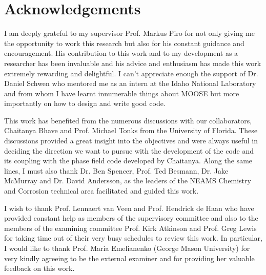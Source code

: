 \chapter*{Acknowledgements}
\label{acknowledgements}

I am deeply grateful to my supervisor Prof. Markus Piro for not only giving me the opportunity to work this research but also for his constant guidance and encouragement. His contribution to this work and to my development as a researcher has been invaluable and his advice and enthusiasm has made this work extremely rewarding and delightful. I can't appreciate enough the support of Dr. Daniel Schwen who mentored me as an intern at the Idaho National Laboratory and from whom I have learnt innumerable things about MOOSE but more importantly on how to design and write good code.

This work has benefited from the numerous discussions with our collaborators, Chaitanya Bhave and Prof. Michael Tonks from the University of Florida. These discussions provided a great insight into the objectives and were always useful in deciding the direction we want to pursue with the development of the code and its coupling with the phase field code developed by Chaitanya. Along the same lines, I must also thank Dr. Ben Spencer, Prof. Ted Besmann, Dr. Jake McMurray and Dr. David Andersson, as the leaders of the NEAMS Chemistry and Corrosion technical area facilitated and guided this work. %

I wish to thank Prof. Lennaert van Veen and Prof. Hendrick de Haan who have provided constant help as members of the supervisory committee and also to the members of the examining committee Prof. Kirk Atkinson and Prof. Greg Lewis for taking time out of their very busy schedules to review this work. In particular, I would like to thank Prof. Maria Emelianenko (George Mason University) for very kindly agreeing to be the external examiner and for providing her valuable feedback on this work.

